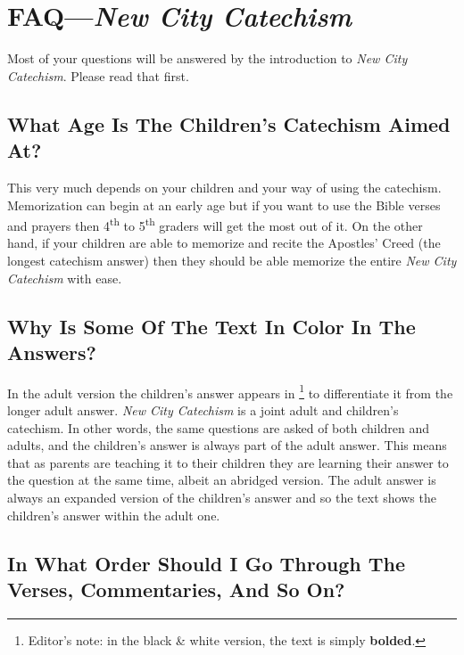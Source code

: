 

\chapter{FAQ---{\em New City Catechism}}

Most of your questions will be answered by the introduction to \emph{New City Catechism}. Please read that first.

\section[What Age Is The Children's Catechism Aimed At?][Catechism For What Age Children?]{What Age Is The Children's Catechism Aimed At?}

This very much depends on your children and your way of using the catechism. Memorization can begin at an early age but if you want to use the Bible verses and prayers then 4\textsuperscript{th} to 5\textsuperscript{th} graders will get the most out of it. On the other hand, if your children are able to memorize and recite the Apostles' Creed (the longest catechism answer) then they should be able memorize the entire \emph{New City Catechism}\/ with ease.

\section[Why Is Some Of The Text In Color In The Answers?][Why Is Some Text In Color?]{Why Is Some Of The Text In Color In The Answers?}

In the adult version the children's answer appears in \footnote{Editor's note: in the black \& white version, the text is simply \textbf{bolded}.} to differentiate it from the longer adult answer. \emph{New City Catechism}\/ is a joint adult and children's catechism. In other words, the same questions are asked of both children and adults, and the children's answer is always part of the adult answer. This means that as parents are teaching it to their children they are learning their answer to the question at the same time, albeit an abridged version. The adult answer is always an expanded version of the children's answer and so the  text shows the children's answer within the adult one.

\section[In What Order Should I Go Through The Verses, Commentaries, And So On?][Additional Resources]{In What Order Should I Go Through The Verses, Commentaries, And So On?}

